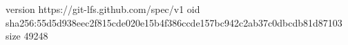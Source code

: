 version https://git-lfs.github.com/spec/v1
oid sha256:55d5d938eec2f815cde020e15b4f386ccde157bc942c2ab37c0dbcdb81d87103
size 49248
